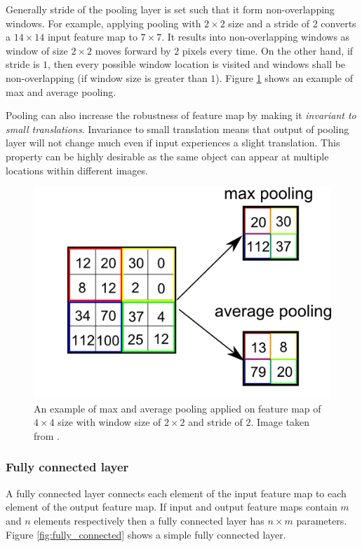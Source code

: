 Generally stride of the pooling layer is set such that it form non-overlapping windows. For example, applying pooling with $2\times2$ size and a stride of $2$ converts a $14 \times 14$ input feature map to $7 \times 7$. It results into non-overlapping windows as window of size  $2\times2$ moves forward by $2$ pixels every time. On the other hand, if stride is $1$, then every possible window location is visited and windows shall be non-overlapping (if window size is greater than $1$). Figure \ref{fig:pooling} shows an example of max and average pooling.

Pooling can also increase the robustness of feature map by making it \textit{invariant to small translations}\cite{goodfellow2016deep}. Invariance to small translation means that output of pooling layer will not change much even if input experiences a slight translation. This property can be highly desirable as the same object can appear at multiple locations within different images. 

\begin{figure}
    \centering
    \includegraphics[width=0.7\linewidth]{images/pooling.png}
    \caption[Pooling operation]{An example of max and average pooling applied on feature map of $4\times 4$ size with window size of $2\times 2$ and stride of $2$. Image taken from \cite{ref_pooling}. }
    \label{fig:pooling}
\end{figure}






\subsubsection{Fully connected layer}
\label{sec:fully_connected_layer}
A fully connected layer connects each element of the input feature map to each element of the output feature map. If input and output feature maps contain $m$ and $n$ elements respectively then a fully connected layer has $n \times m$ parameters. Figure \ref{fig:fully_connected} shows a simple fully connected layer. 

